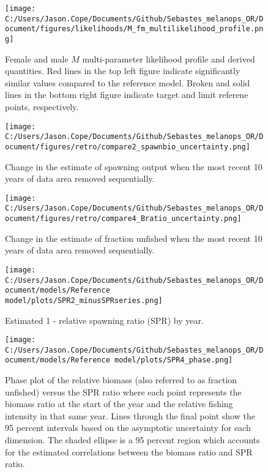 \documentclass[11pt,
  english,
  letterpaper,
]{article}
\begin{document}
\begin{figure}
\centering
\texttt{[image: C:/Users/Jason.Cope/Documents/Github/Sebastes\_melanops\_OR/Document/figures/likelihoods/M\_fm\_multilikelihood\_profile.png]}
\caption{Female and male \(M\) multi-parameter likelihood profile and derived quantities. Red lines in the top left figure indicate significantly similar values compared to the reference model. Broken and solid lines in the bottom right figure indicate target and limit referene points, respectively.\label{fig:M-multiprofile-combo}}
\end{figure}

\begin{figure}
\centering
\texttt{[image: C:/Users/Jason.Cope/Documents/Github/Sebastes\_melanops\_OR/Document/figures/retro/compare2\_spawnbio\_uncertainty.png]}
\caption{Change in the estimate of spawning output when the most recent 10 years of data area removed sequentially.\label{fig:retro-ssb}}
\end{figure}

\begin{figure}
\centering
\texttt{[image: C:/Users/Jason.Cope/Documents/Github/Sebastes\_melanops\_OR/Document/figures/retro/compare4\_Bratio\_uncertainty.png]}
\caption{Change in the estimate of fraction unfished when the most recent 10 years of data area removed sequentially.\label{fig:retro-depl}}
\end{figure}

\newpage

\begin{figure}
\centering
\texttt{[image: C:/Users/Jason.Cope/Documents/Github/Sebastes\_melanops\_OR/Document/models/Reference model/plots/SPR2\_minusSPRseries.png]}
\caption{Estimated 1 - relative spawning ratio (SPR) by year.\label{fig:1-spr}}
\end{figure}

\clearpage

\begin{figure}
\centering
\texttt{[image: C:/Users/Jason.Cope/Documents/Github/Sebastes\_melanops\_OR/Document/models/Reference model/plots/SPR4\_phase.png]}
\caption{Phase plot of the relative biomass (also referred to as fraction unfished) versus the SPR ratio where each point represents the biomass ratio at the start of the year and the relative fishing intensity in that same year. Lines through the final point show the 95 percent intervals based on the asymptotic uncertainty for each dimension. The shaded ellipse is a 95 percent region which accounts for the estimated correlations between the biomass ratio and SPR ratio.\label{fig:phase}}
\end{figure}
\end{document}
